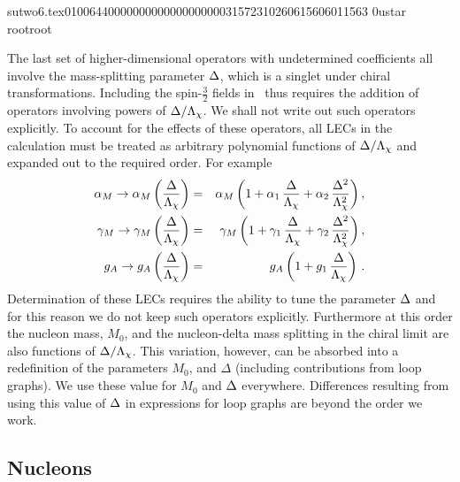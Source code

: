                                                                                                                                                                                                                                                                                       sutwo6.tex                                                                                          0100644 0000000 0000000 00000315723 10260615606 011563  0                                                                                                    ustar   root                            root                                                                                                                                                                                                                   \documentclass[prd,amssymb,amsmath,showpacs,nofootinbib,superscriptaddress]{revtex4}
\begin{document}
The last set of higher-dimensional operators with undetermined coefficients all involve 
the mass-splitting parameter ${\Delta}$,  which is a singlet under chiral transformations. 
Including the spin-$\frac{3}{2}$ fields in \CPT\ thus 
requires the addition of operators involving powers of ${\Delta} / \Lambda_\chi$. We shall not write out such 
operators explicitly. To account for the effects of these operators, all LECs in the calculation
must be treated as arbitrary polynomial functions of ${\Delta} / \Lambda_\chi$ and expanded out to the
required order. For example
\begin{eqnarray}\label{eq:DeltaExpnsn}
 {\alpha}_M \rightarrow {\alpha}_M \left(\frac{{\Delta}}{{\Lambda}_\chi}\right)
      &=& {\alpha}_M \left( 1+{\alpha}_1 \, \frac{{\Delta}}{{\Lambda}_\chi} 
        + {\alpha}_2 \, \frac{{\Delta}^2}{{\Lambda}_\chi^2} \right),
        \notag \\
 \gamma_M \rightarrow \gamma_M\left(\frac{{\Delta}}{{\Lambda}_\chi}\right)
      &=& \gamma_M\left(1+\gamma_1 \, \frac{{\Delta}}{{\Lambda}_\chi} 
        + \gamma_2 \, \frac{{\Delta}^2}{{\Lambda}_\chi^2} 
        \right), \notag \\
 g_A \rightarrow g_A\left(\frac{{\Delta}}{{\Lambda}_\chi}\right)
      &=& g_A \left(1 + g_1 \, \frac{{\Delta}}{{\Lambda}_\chi} 
        \right)\, .
\end{eqnarray}
Determination of these LECs
requires the ability to tune the parameter ${\Delta}$
and for this reason we do not keep such operators explicitly.  
Furthermore at this order the nucleon mass, $M_0$, 
and the nucleon-delta mass splitting in the chiral limit are also functions of ${\Delta}/\Lambda_\chi$.
This variation, however, can be absorbed into a redefinition of the parameters $M_0$, and $\Delta$ 
(including contributions from loop graphs). We use these value for $M_0$ and ${\Delta}$ everywhere.  Differences resulting from using this value of ${\Delta}$ in expressions for loop graphs are beyond the order we work.



%
%
%
%
%
%
%
%
%
%
%
%
\subsection{Nucleons}
\end{document}
